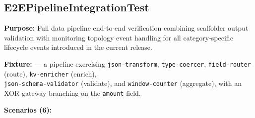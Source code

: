 
\subsection{E2EPipelineIntegrationTest}
\label{it:e2ePipeline}

\textbf{Purpose:} Full data pipeline end-to-end verification combining
scaffolder output validation with monitoring topology event handling for
all category-specific lifecycle events introduced in the current release.

\textbf{Fixture:}  ---
a pipeline exercising \texttt{json-transform}, \texttt{type-coercer},
\texttt{field-router} (route), \texttt{kv-enricher} (enrich), \\
\texttt{json-schema-validator} (validate), and \texttt{window-counter}
(aggregate), with an XOR gateway branching on the \texttt{amount} field.

\textbf{Scenarios (6):}

